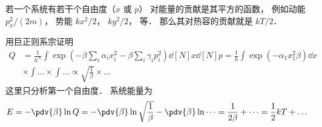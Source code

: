 
若一个系统有若干个自由度（$x$ 或 $p$） 对能量的贡献是其平方的函数， 例如动能 $p_x^2/(2m)$， 势能 $kx^2/2$， $ky^2/2$， 等． 那么其对热容的贡献就是 $kT/2$．

用巨正则系宗证明
\begin{equation}
\begin{aligned}
Q &= \frac{1}{h^N} \int \exp(-\beta \sum_i \alpha_i x_i^2 - \beta \sum_i \gamma_i p_i^2) \dd[N]{x} \dd[N]{p} = \frac{1}{h} \int \exp(-\alpha_1 x_1^2 \beta) \dd{x}\\
& \times \int \dots \times \int \dots \propto \sqrt{\frac{1}{\beta}} \times \dots
\end{aligned}
\end{equation}
这里只分析第一个自由度． 系统能量为
\begin{equation}
E = -\pdv{\beta} \ln Q = -\pdv{\beta} \ln \sqrt{\frac{1}{\beta}} - \pdv{\beta} \ln \dots = \frac{1}{2\beta} + \dots = \frac{1}{2}kT + \dots
\end{equation}
